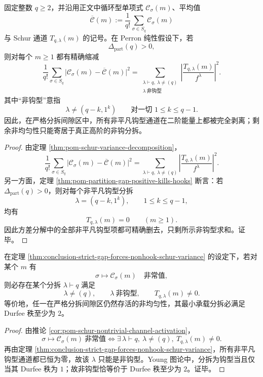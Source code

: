 \begin{theorem}\label{thm:conclusion-strict-gap-forces-nonhook-schur-variance}
固定整数 \(q\ge 2\)，并沿用正文中循环型单项式 \(\mathcal C_\sigma(m)\)、平均值
\[
\overline{\mathcal C}(m):=\frac{1}{q!}\sum_{\sigma\in S_q}\mathcal C_\sigma(m)
\]
与 Schur 通道 \(T_{q,\lambda}(m)\) 的记号。在 Perron 纯性假设下，若
\[
\Delta_{\mathrm{part}}(q)>0,
\]
则对每个 \(m\ge 1\) 都有精确缩减
\[
\frac{1}{q!}\sum_{\sigma\in S_q}\bigl|\mathcal C_\sigma(m)-\overline{\mathcal C}(m)\bigr|^2
=
\sum_{\substack{\lambda\vdash q,\ \lambda\neq (q)\\ \lambda\ \text{非钩型}}}
\left|\frac{T_{q,\lambda}(m)}{f^\lambda}\right|^2.
\]
其中“非钩型”意指
\[
\lambda\neq (q-k,1^k)
\qquad
\text{对一切 }1\le k\le q-1.
\]
因此，在严格分拆间隙区中，所有非平凡钩型通道在二阶能量上都被完全剥离；剩余非均匀性只能寄居于真正高阶的非钩分拆。
\end{theorem}
\begin{proof}
由定理 \ref{thm:pom-schur-variance-decomposition}，
\[
\frac{1}{q!}\sum_{\sigma\in S_q}\bigl|\mathcal C_\sigma(m)-\overline{\mathcal C}(m)\bigr|^2
=
\sum_{\lambda\vdash q,\ \lambda\neq(q)}
\left|\frac{T_{q,\lambda}(m)}{f^\lambda}\right|^2.
\]
另一方面，定理 \ref{thm:pom-partition-gap-positive-kills-hooks} 断言：若 \(\Delta_{\mathrm{part}}(q)>0\)，则对每个非平凡钩型分拆
\[
\lambda=(q-k,1^k),
\qquad
1\le k\le q-1,
\]
均有
\[
T_{q,\lambda}(m)=0
\qquad
(m\ge 1).
\]
因此方差分解中的全部非平凡钩型项都可精确删去，只剩所示非钩型求和。证毕。
\end{proof}

\begin{corollary}[非均匀性的最小承载复杂度跃迁]\label{cor:conclusion-nonuniformity-minimal-carrier-jumps-to-nonhook}
在定理 \ref{thm:conclusion-strict-gap-forces-nonhook-schur-variance} 的设定下，若对某个 \(m\) 有
\[
\sigma\longmapsto \mathcal C_\sigma(m)
\quad\text{非常值},
\]
则必存在某个分拆 \(\lambda\vdash q\) 满足
\[
\lambda\neq(q),
\qquad
\lambda\ \text{非钩型},
\qquad
T_{q,\lambda}(m)\neq 0.
\]
等价地，任一在严格分拆间隙区仍然存活的非均匀性，其最小承载分拆必满足 Durfee 秩至少为 \(2\)。
\end{corollary}
\begin{proof}
由推论 \ref{cor:pom-schur-nontrivial-channel-activation}，
\[
\sigma\longmapsto \mathcal C_\sigma(m)\ \text{非常值}
\iff
\exists\,\lambda\vdash q,\ \lambda\neq(q),\ T_{q,\lambda}(m)\neq 0.
\]
再由定理 \ref{thm:conclusion-strict-gap-forces-nonhook-schur-variance}，所有非平凡钩型通道都已恒为零，故该 \(\lambda\) 只能是非钩型。Young 图论中，分拆为钩型当且仅当其 Durfee 秩为 \(1\)；故非钩型恰等价于 Durfee 秩至少为 \(2\)。证毕。
\end{proof}

